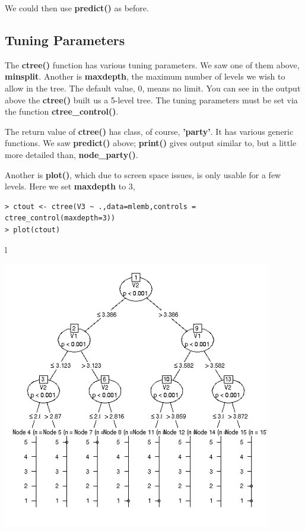 We could then use \textbf{predict()} as before.

\subsection{Tuning Parameters}

The \textbf{ctree()} function has various tuning parameters.  We saw one
of them above, \textbf{minsplit}.  Another is \textbf{maxdepth}, the
maximum number of levels we wish to allow in the tree.   The default
value, 0, means no limit.  You can see in the output above the
\textbf{ctree()} built us a 5-level tree.  The tuning parameters must be
set via the function \textbf{ctree\_control()}.

The return value of \textbf{ctree()} has class, of course,
\textbf{'party'}.  It has various generic functions.  We saw
\textbf{predict()} above; \textbf{print()} gives output similar to, but
a little more detailed than, \textbf{node\_party()}.  

Another is \textbf{plot()}, which due to screen space issues, is only
usable for a few levels.  Here we set \textbf{maxdepth} to 3,

\begin{lstlisting}
> ctout <- ctree(V3 ~ .,data=mlemb,controls = ctree_control(maxdepth=3))
> plot(ctout)
\end{lstlisting}l

\includegraphics[width=4.6in]{Images/MLmaxdepth3.png}


